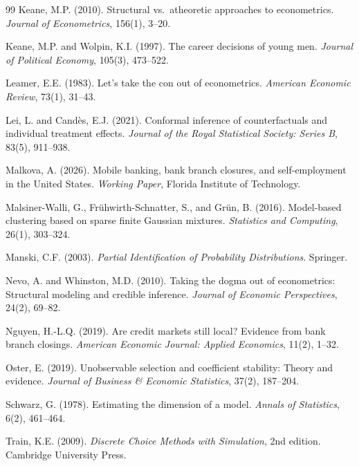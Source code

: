 \documentclass[12pt]{article}
\begin{document}
\begin{thebibliography}{99}
Keane, M.P. (2010). Structural vs.\ atheoretic approaches to econometrics. \textit{Journal of Econometrics}, 156(1), 3--20.

Keane, M.P. and Wolpin, K.I. (1997). The career decisions of young men. \textit{Journal of Political Economy}, 105(3), 473--522.

Leamer, E.E. (1983). Let's take the con out of econometrics. \textit{American Economic Review}, 73(1), 31--43.

Lei, L. and Cand\`{e}s, E.J. (2021). Conformal inference of counterfactuals and individual treatment effects. \textit{Journal of the Royal Statistical Society: Series B}, 83(5), 911--938.

Malkova, A. (2026). Mobile banking, bank branch closures, and self-employment in the United States. \textit{Working Paper}, Florida Institute of Technology.

Malsiner-Walli, G., Fr\"{u}hwirth-Schnatter, S., and Gr\"{u}n, B. (2016). Model-based clustering based on sparse finite Gaussian mixtures. \textit{Statistics and Computing}, 26(1), 303--324.

Manski, C.F. (2003). \textit{Partial Identification of Probability Distributions}. Springer.

Nevo, A. and Whinston, M.D. (2010). Taking the dogma out of econometrics: Structural modeling and credible inference. \textit{Journal of Economic Perspectives}, 24(2), 69--82.

Nguyen, H.-L.Q. (2019). Are credit markets still local? Evidence from bank branch closings. \textit{American Economic Journal: Applied Economics}, 11(2), 1--32.

Oster, E. (2019). Unobservable selection and coefficient stability: Theory and evidence. \textit{Journal of Business \& Economic Statistics}, 37(2), 187--204.

Schwarz, G. (1978). Estimating the dimension of a model. \textit{Annals of Statistics}, 6(2), 461--464.

Train, K.E. (2009). \textit{Discrete Choice Methods with Simulation}, 2nd edition. Cambridge University Press.

\end{thebibliography}
\end{document}
